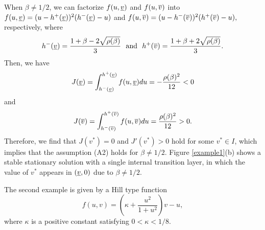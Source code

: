 \documentclass[a4,10pt]{article}
\begin{document}
When $\beta \neq 1/2$, we can factorize 
$f(u, \underline{v})$ and $f(u, \overline{v})$ into 
$
f(u, \underline{v})= (u - h^+(\underline{v}))^2 (h^-(\underline{v}) - u)
$
and 
$
f(u, \overline{v})= (u - h^-(\overline{v}))^2 (h^+(\overline{v}) - u),
$
%
respectively, where
%
$$ 
\displaystyle{ h^-(\un{v}) = \frac{1 + \beta - 2 \sqrt{\rho(\beta)} }{3} }
\ \ \text{and} \ \ 
\displaystyle{ h^+(\ov{v}) =  \frac{1 + \beta + 2 \sqrt{\rho(\beta)} }{3} }. 
$$
%
Then, we have
$$
J (\underline{v})  =  \int_{h^-(\underline{v})}^{h^+(\underline{v})} f(u, \underline{v})du  = - \frac{\rho(\beta)^2}{12} < 0
$$
and 
$$ 
J (\overline{v})  =  \int_{h^-(\overline{v})}^{h^+(\overline{v})} f(u, \overline{v})du =  \frac{\rho(\beta)^2}{12} > 0. 
$$
Therefore, we find that $J(v^*) = 0$ and $J'(v^*) > 0$ hold for some $v^* \in I$, which implies that the assumption (A2) holds for $\beta \neq 1/2$.
Figure \ref{example1}(b) shows a stable stationary solution with a single internal 
transition layer, in which the value of $v^*$ appears in $(\underline{v}, 0)$ due to 
$\beta \neq 1/2$.


\begin{example} \rm
%
The second example is given by a Hill type function
%
\begin{equation}\label{mori}
f(u, v) = 
\displaystyle{
\left( \kappa + \frac{u^2}{1+u^2} \right) v - u,
}
\end{equation}
%
where $\kappa$ is a positive constant satisfying $0 < \kappa < 1/8$.
%
\end{example}
\end{document}
